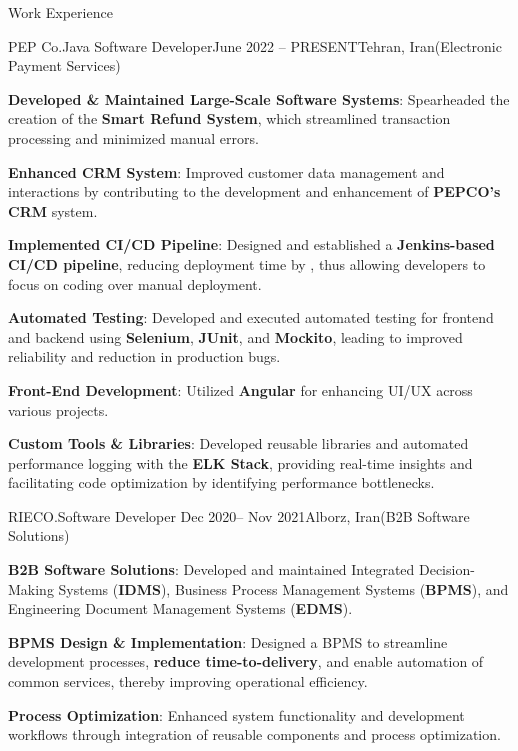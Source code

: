 \documentclass[]{kyvernitis-resume}
\begin{document}
\begin{section}{Work Experience}
    \begin{subsection}{PEP Co.}{Java Software Developer}{June 2022 -- PRESENT}{Tehran, Iran}{(Electronic Payment Services)}

		\item \textbf{Developed \& Maintained Large-Scale Software Systems}: Spearheaded the creation of the  \textbf{Smart Refund System}, which streamlined transaction processing and minimized manual errors.
		\item \textbf{Enhanced CRM System}: Improved customer data management and interactions by contributing to the development and enhancement of \textbf{PEPCO's CRM} system.
		\item \textbf{Implemented CI/CD Pipeline}: Designed and established a \textbf{Jenkins-based CI/CD pipeline}, reducing deployment time by %
, thus allowing developers to focus on coding over manual deployment.

		\item \textbf{Automated Testing}: Developed and executed automated testing for frontend and backend using \textbf{Selenium}, \textbf{JUnit}, and \textbf{Mockito}, leading to improved reliability and reduction in production bugs.
		\item \textbf{Front-End Development}: Utilized \textbf{Angular} for enhancing UI/UX across various projects.
		\item \textbf{Custom Tools \& Libraries}: Developed reusable libraries and automated performance logging with the \textbf{ELK Stack}, providing real-time insights and facilitating code optimization by identifying performance bottlenecks.

    \end{subsection}


 \begin{subsection}{RIECO.}{Software Developer }{Dec 2020-- Nov 2021}{Alborz, Iran}{(B2B Software Solutions)}
	
	\item \textbf{B2B Software Solutions}: Developed and maintained Integrated Decision-Making Systems (\textbf{IDMS}), Business Process Management Systems (\textbf{BPMS}), and Engineering Document Management Systems (\textbf{EDMS}).
	\item \textbf{BPMS Design \& Implementation}: Designed a BPMS to streamline development processes, \textbf{reduce time-to-delivery}, and enable automation of common services, thereby improving operational efficiency.
	\item \textbf{Process Optimization}: Enhanced system functionality and development workflows through integration of reusable components and process optimization.


\end{subsection}
\end{section}
\end{document}
